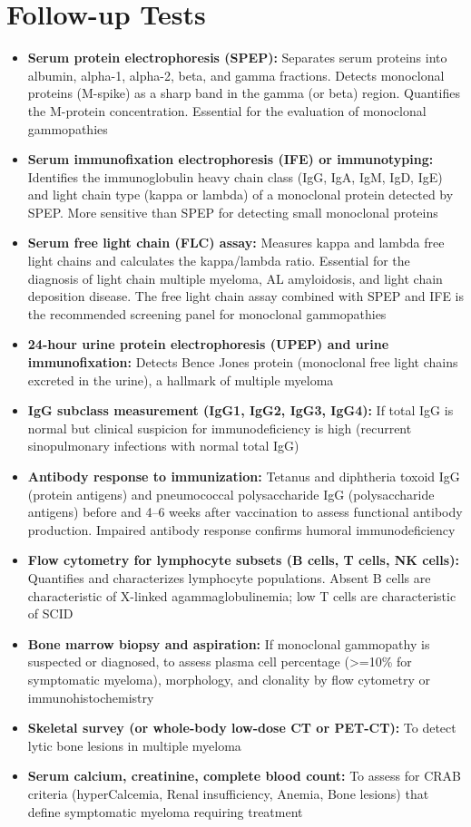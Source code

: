 \section*{Follow-up Tests}
\begin{itemize}
  \item \textbf{Serum protein electrophoresis (SPEP):} Separates serum proteins into albumin, alpha-1, alpha-2, beta, and gamma fractions. Detects monoclonal proteins (M-spike) as a sharp band in the gamma (or beta) region. Quantifies the M-protein concentration. Essential for the evaluation of monoclonal gammopathies
  \item \textbf{Serum immunofixation electrophoresis (IFE) or immunotyping:} Identifies the immunoglobulin heavy chain class (IgG, IgA, IgM, IgD, IgE) and light chain type (kappa or lambda) of a monoclonal protein detected by SPEP. More sensitive than SPEP for detecting small monoclonal proteins
  \item \textbf{Serum free light chain (FLC) assay:} Measures kappa and lambda free light chains and calculates the kappa/lambda ratio. Essential for the diagnosis of light chain multiple myeloma, AL amyloidosis, and light chain deposition disease. The free light chain assay combined with SPEP and IFE is the recommended screening panel for monoclonal gammopathies
  \item \textbf{24-hour urine protein electrophoresis (UPEP) and urine immunofixation:} Detects Bence Jones protein (monoclonal free light chains excreted in the urine), a hallmark of multiple myeloma
  \item \textbf{IgG subclass measurement (IgG1, IgG2, IgG3, IgG4):} If total IgG is normal but clinical suspicion for immunodeficiency is high (recurrent sinopulmonary infections with normal total IgG)
  \item \textbf{Antibody response to immunization:} Tetanus and diphtheria toxoid IgG (protein antigens) and pneumococcal polysaccharide IgG (polysaccharide antigens) before and 4--6 weeks after vaccination to assess functional antibody production. Impaired antibody response confirms humoral immunodeficiency
  \item \textbf{Flow cytometry for lymphocyte subsets (B cells, T cells, NK cells):} Quantifies and characterizes lymphocyte populations. Absent B cells are characteristic of X-linked agammaglobulinemia; low T cells are characteristic of SCID
  \item \textbf{Bone marrow biopsy and aspiration:} If monoclonal gammopathy is suspected or diagnosed, to assess plasma cell percentage (>=10\% for symptomatic myeloma), morphology, and clonality by flow cytometry or immunohistochemistry
  \item \textbf{Skeletal survey (or whole-body low-dose CT or PET-CT):} To detect lytic bone lesions in multiple myeloma
  \item \textbf{Serum calcium, creatinine, complete blood count:} To assess for CRAB criteria (hyperCalcemia, Renal insufficiency, Anemia, Bone lesions) that define symptomatic myeloma requiring treatment
\end{itemize}

